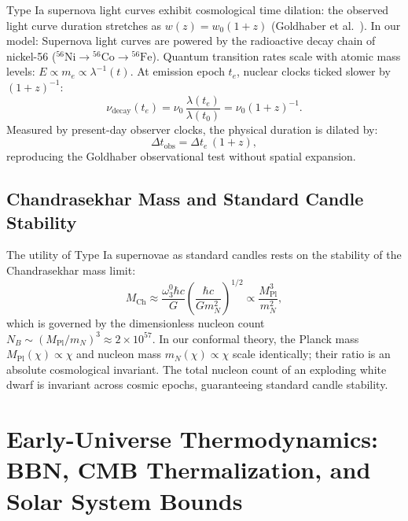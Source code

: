 \documentclass[11pt,a4paper]{article}
\begin{document}
Type Ia supernova light curves exhibit cosmological time dilation: the observed light curve duration stretches as $w(z) = w_0 (1+z)$ (Goldhaber et al.~\cite{goldhaber2001}). In our model:
Supernova light curves are powered by the radioactive decay chain of nickel-56 ($^{56}\mathrm{Ni} \to {}^{56}\mathrm{Co} \to {}^{56}\mathrm{Fe}$). Quantum transition rates scale with atomic mass levels: $E \propto m_e \propto \lambda^{-1}(t)$. At emission epoch $t_e$, nuclear clocks ticked slower by $(1+z)^{-1}$:
\begin{equation}
    \nu_{\mathrm{decay}}(t_e) = \nu_0 \, \frac{\lambda(t_e)}{\lambda(t_0)} = \nu_0 (1+z)^{-1}.
\end{equation}
Measured by present-day observer clocks, the physical duration is dilated by:
\begin{equation}
    \Delta t_{\mathrm{obs}} = \Delta t_e \, (1 + z),
    \label{eq:goldhaber_proof}
\end{equation}
reproducing the Goldhaber observational test without spatial expansion.

\subsection{Chandrasekhar Mass and Standard Candle Stability}
The utility of Type Ia supernovae as standard candles rests on the stability of the Chandrasekhar mass limit:
\begin{equation}
    M_{\mathrm{Ch}} \approx \frac{\omega_3^0 \hbar c}{G} \left( \frac{\hbar c}{G m_N^2} \right)^{1/2} \propto \frac{M_{\mathrm{Pl}}^3}{m_N^2},
    \label{eq:chandrasekhar_def}
\end{equation}
which is governed by the dimensionless nucleon count $N_B \sim (M_{\mathrm{Pl}}/m_N)^3 \approx 2 \times 10^{57}$. In our conformal theory, the Planck mass $M_{\mathrm{Pl}}(\chi) \propto \chi$ and nucleon mass $m_N(\chi) \propto \chi$ scale identically; their ratio is an absolute cosmological invariant. The total nucleon count of an exploding white dwarf is invariant across cosmic epochs, guaranteeing standard candle stability.

\section{Early-Universe Thermodynamics: BBN, CMB Thermalization, and Solar System Bounds}
\label{sec:bbn_cmb}
\end{document}
